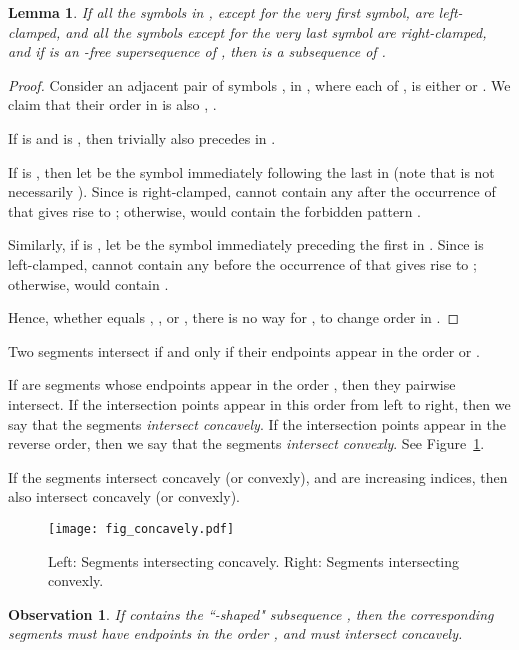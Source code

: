 \documentclass[11pt]{article}
\newtheorem{lemma}[theorem]{Lemma}
\newtheorem{observation}[theorem]{Observation}
\theoremstyle{definition}
\theoremstyle{remark}
\begin{document}
\begin{lemma}\label{lemma_clamped}
If all the symbols in , except for the very first symbol, are left-clamped, and all the symbols except for the very last symbol are right-clamped, and if  is an -free supersequence of , then  is a subsequence of .
\end{lemma}

\begin{proof}
Consider an adjacent pair of symbols ,  in , where each of ,  is either  or . We claim that their order in  is also , .

If  is  and  is , then trivially  also precedes  in .

If  is , then let  be the symbol immediately following the last  in  (note that  is not necessarily ). Since  is right-clamped,  cannot contain any  after the occurrence of  that gives rise to ; otherwise,  would contain the forbidden pattern .

Similarly, if  is , let  be the symbol immediately preceding the first  in . Since  is left-clamped,  cannot contain any  before the occurrence of  that gives rise to ; otherwise,  would contain .

Hence, whether  equals , , or , there is no way for ,  to change order in .
\end{proof}

Two segments  intersect if and only if their endpoints appear in the order  or .

If  are segments whose endpoints appear in the order , then they pairwise intersect. If the intersection points  appear in this order from left to right, then we say that the segments \emph{intersect concavely}. If the intersection points appear in the reverse order, then we say that the segments \emph{intersect convexly}. See Figure~\ref{fig_concavely}.

If the segments  intersect concavely (or convexly), and  are increasing indices, then  also intersect concavely (or convexly).

\begin{figure}
\centerline{\texttt{[image: fig\_concavely.pdf]}}
\caption{\label{fig_concavely}Left: Segments intersecting concavely. Right: Segments intersecting convexly.}
\end{figure}

\begin{observation}\label{obs_Nshaped}
If  contains the ``-shaped" subsequence , then the corresponding segments must have endpoints in the order , and must intersect concavely.
\end{observation}
\end{document}
